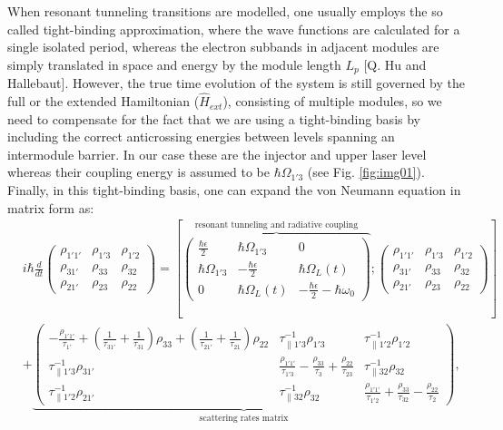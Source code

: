 \documentclass[10pt,letterpaper]{article}
\begin{document}
When resonant tunneling transitions are modelled, one usually employs the so called tight-binding approximation, where the wave functions are calculated for a single isolated period, whereas the electron subbands in adjacent modules are simply translated in space and energy by the module length $L_p$ [Q. Hu and Hallebaut]. However, the true time evolution of the system is still governed by the full or the extended Hamiltonian ($\hat{H}_{ext}$), consisting of multiple modules, so we need to compensate for the fact that we are using a tight-binding basis by including the correct anticrossing energies between levels spanning an intermodule barrier. In our case these are the injector and upper laser level whereas their coupling energy is assumed to be $\hbar \Omega_{1'3}$ (see Fig. \ref{fig:img01}). Finally, in this tight-binding basis, one can expand the von Neumann equation in matrix form as:
\begin{align}
 \label{eq:vonNeumannmatrix}
& i \hbar \frac{d}{dt} \begin{pmatrix}
\rho_{1'1'}& \rho_{1'3} & \rho_{1'2} \\
\rho_{31'} & \rho_{33} & \rho_{32} \\ 
\rho_{21'} & \rho_{23} & \rho_{22}
\end{pmatrix}  =  \left [ 
\overbrace{\begin{pmatrix} 
 \frac{\hbar \epsilon}{2} & \hbar\Omega_{1'3} & 0 \\
\hbar\Omega_{1'3}  & -\frac{\hbar	\epsilon}{2} &  \hbar\Omega_{L}(t) \\
0  &\hbar\Omega_{L}(t) & -\frac{\hbar \epsilon}{2}-\hbar\omega_{0}   
\end{pmatrix} }^{\text{resonant tunneling and radiative coupling}}
; 
\begin{pmatrix}
\rho_{1'1'}& \rho_{1'3} & \rho_{1'2} \\
\rho_{31'} & \rho_{33} & \rho_{32} \\ 
\rho_{21'} & \rho_{23} & \rho_{22}
\end{pmatrix}
\right ]  \nonumber \\
& + 
\underbrace{\begin{pmatrix}
	-\frac{\rho_{1'1'}}{\tau_{1'}} + (\frac{1}{\tau_{31'}}+\frac{1}{\tau_{31}})\rho_{33}  +  (\frac{1}{\tau_{21'}}+\frac{1}{\tau_{21}})\rho_{22} & \tau_{\parallel 1'3}^{-1}\rho_{1'3} & \tau_{\parallel 1'2}^{-1}\rho_{1'2}\\
   \tau_{\parallel 1'3}^{-1}\rho_{31'} & \frac{\rho_{1'1'}}{\tau_{1'3}}   - \frac{\rho_{33}}{\tau_{3}} +  \frac{\rho_{22}}{\tau_{23}} &  \tau_{\parallel 32}^{-1}\rho_{32}\\
   \tau_{\parallel 1'2}^{-1}\rho_{21'}& \tau_{\parallel 32}^{-1}\rho_{32} &	\frac{ \rho_{1'1'}}{\tau_{1'2}} + \frac{\rho_{33} }{\tau_{32}} 	- \frac{\rho_{22}}{\tau_2}
\end{pmatrix}}_{\text{scattering rates matrix}},
\end{align}
\end{document}
